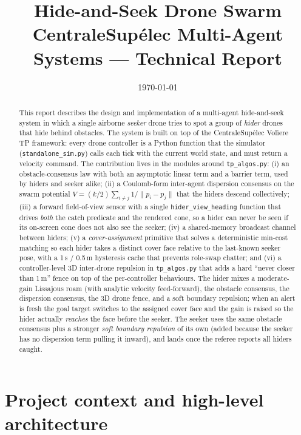 \documentclass[11pt,a4paper]{article}
\title{Hide-and-Seek Drone Swarm \\
       \large CentraleSup\'elec Multi-Agent Systems --- Technical Report}
\date{\today}
\newcommand{\code}[1]{\texttt{#1}}
\begin{document}
\maketitle

\begin{abstract}
This report describes the design and implementation of a multi-agent
hide-and-seek system in which a single airborne \emph{seeker} drone tries to
spot a group of \emph{hider} drones that hide behind obstacles. The system is
built on top of the CentraleSup\'elec Vol\`iere TP framework: every drone
controller is a Python function that the simulator (\code{standalone\_sim.py})
calls each tick with the current world state, and must return a velocity
command. The contribution lives in the modules around \code{tp\_algos.py}:
(i) an obstacle-consensus law with both an asymptotic linear term and a
barrier term, used by hiders and seeker alike; (ii) a Coulomb-form
inter-agent dispersion consensus on the swarm potential
$V = (k/2)\sum_{i \ne j} 1/\|p_i-p_j\|$ that the hiders descend collectively;
(iii) a forward field-of-view sensor with a single \code{hider\_view\_heading}
function that drives \emph{both} the catch predicate and the rendered cone,
so a hider can never be seen if its on-screen cone does not also see the
seeker; (iv) a shared-memory broadcast channel between hiders; (v) a
\emph{cover-assignment} primitive that solves a deterministic min-cost
matching so each hider takes a distinct cover face relative to the
last-known seeker pose, with a 1\,s / 0.5\,m hysteresis cache that prevents
role-swap chatter; and (vi) a controller-level 3D inter-drone repulsion in
\code{tp\_algos.py} that adds a hard ``never closer than 1\,m'' fence on top
of the per-controller behaviours. The hider mixes a moderate-gain Lissajous
roam (with analytic velocity feed-forward), the obstacle consensus, the
dispersion consensus, the 3D drone fence, and a soft boundary repulsion;
when an alert is fresh the goal target switches to the assigned cover face
and the gain is raised so the hider actually \emph{reaches} the face before
the seeker. The seeker uses the same obstacle consensus plus a stronger
\emph{soft boundary repulsion} of its own (added because the seeker has no
dispersion term pulling it inward), and lands once the referee reports all
hiders caught.
\end{abstract}

\tableofcontents
\clearpage

\section{Project context and high-level architecture}
\end{document}
